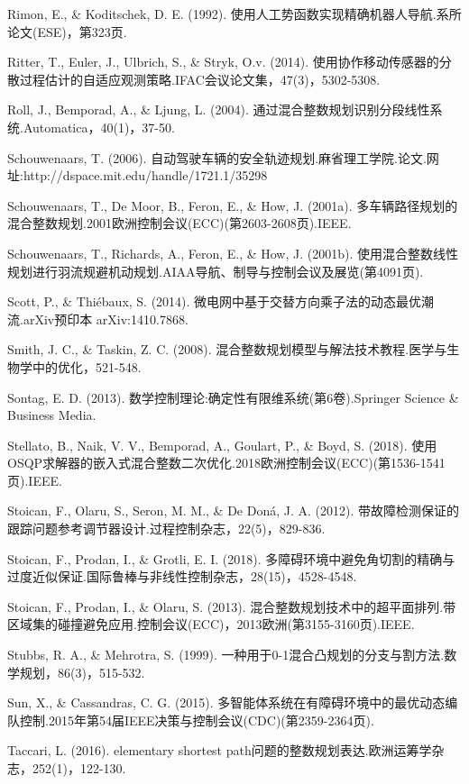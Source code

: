 \documentclass[10pt]{article}
\begin{document}
Rimon, E., \& Koditschek, D. E. (1992). 使用人工势函数实现精确机器人导航.系所论文(ESE)，第323页.

Ritter, T., Euler, J., Ulbrich, S., \& Stryk, O.v. (2014). 使用协作移动传感器的分散过程估计的自适应观测策略.IFAC会议论文集，47(3)，5302-5308.

Roll, J., Bemporad, A., \& Ljung, L. (2004). 通过混合整数规划识别分段线性系统.Automatica，40(1)，37-50.

Schouwenaars, T. (2006). 自动驾驶车辆的安全轨迹规划.麻省理工学院.论文.网址:http://dspace.mit.edu/handle/1721.1/35298

Schouwenaars, T., De Moor, B., Feron, E., \& How, J. (2001a). 多车辆路径规划的混合整数规划.2001欧洲控制会议(ECC)(第2603-2608页).IEEE.

Schouwenaars, T., Richards, A., Feron, E., \& How, J. (2001b). 使用混合整数线性规划进行羽流规避机动规划.AIAA导航、制导与控制会议及展览(第4091页).

Scott, P., \& Thiébaux, S. (2014). 微电网中基于交替方向乘子法的动态最优潮流.arXiv预印本 arXiv:1410.7868.

Smith, J. C., \& Taskin, Z. C. (2008). 混合整数规划模型与解法技术教程.医学与生物学中的优化，521-548.

Sontag, E. D. (2013). 数学控制理论:确定性有限维系统(第6卷).Springer Science \& Business Media.

Stellato, B., Naik, V. V., Bemporad, A., Goulart, P., \& Boyd, S. (2018). 使用OSQP求解器的嵌入式混合整数二次优化.2018欧洲控制会议(ECC)(第1536-1541页).IEEE.

Stoican, F., Olaru, S., Seron, M. M., \& De Doná, J. A. (2012). 带故障检测保证的跟踪问题参考调节器设计.过程控制杂志，22(5)，829-836.

Stoican, F., Prodan, I., \& Grotli, E. I. (2018). 多障碍环境中避免角切割的精确与过度近似保证.国际鲁棒与非线性控制杂志，28(15)，4528-4548.

Stoican, F., Prodan, I., \& Olaru, S. (2013). 混合整数规划技术中的超平面排列.带区域集的碰撞避免应用.控制会议(ECC)，2013欧洲(第3155-3160页).IEEE.

Stubbs, R. A., \& Mehrotra, S. (1999). 一种用于0-1混合凸规划的分支与割方法.数学规划，86(3)，515-532.

Sun, X., \& Cassandras, C. G. (2015). 多智能体系统在有障碍环境中的最优动态编队控制.2015年第54届IEEE决策与控制会议(CDC)(第2359-2364页).

Taccari, L. (2016).  elementary shortest path问题的整数规划表达.欧洲运筹学杂志，252(1)，122-130.
\end{document}
